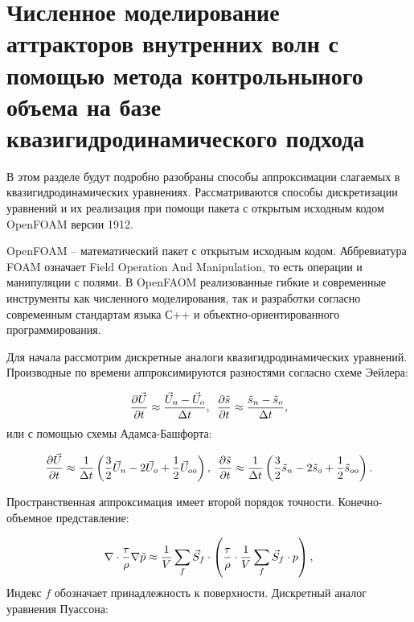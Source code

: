 \section{Численное моделирование аттракторов внутренних волн с помощью метода контрольныного объема на базе квазигидродинамического подхода}

В этом разделе будут подробно разобраны способы аппроксимации слагаемых в квазигидродинамических уравнениях. Рассматриваются способы дискретизации уравнений и их реализация при помощи пакета с открытым исходным кодом OpenFOAM версии 1912\cite{OpenFOAM}.

OpenFOAM -- математический пакет с открытым исходным кодом. Аббревиатура FOAM означает Field Operation And Manipulation, то есть операции и манипуляции с полями. В OpenFAOM реализованные гибкие и современные инструменты как численного моделирования, так и разработки согласно современным стандартам языка С++ и объектно-ориентированного программирования. 

Для начала рассмотрим дискретные аналоги квазигидродинамических уравнений. Производные по времени аппроксимируются разностями согласно схеме Эейлера:

\begin{equation}
    \frac{\partial \vec{U}}{\partial t} \approx \frac{ \vec{U}_n-\vec{U}_o}{\Delta t}, \,\,\,
    \frac{\partial \Tilde{s}}{\partial t} \approx \frac{ \Tilde{s}_n-\Tilde{s}_o}{\Delta t},
\end{equation}
или с помощью схемы Адамса-Башфорта:

\begin{equation}
    \frac{\partial \vec{U}}{\partial t} \approx   \frac{1}{\Delta t} \left  (\frac{3}{2}\vec{U}_n - 2\vec{U}_o + \frac{1}{2} \vec{U}_{oo} \right), \,\,\,
    \frac{\partial \Tilde{s}}{\partial t} \approx \frac{1}{\Delta t} \left (\frac{3}{2}\Tilde{s}_n - 2\Tilde{s}_o + \frac{1}{2} \Tilde{s}_{oo}\right).
\end{equation}

Пространственная аппроксимация имеет второй порядок точности. Конечно-объемное представление:

\begin{equation}
        \nabla \cdot \frac{\tau}{\rho}\nabla \Tilde{p} \approx  \frac{1}{V} \sum_f \vec{S}_f \cdot \left(   \frac{\tau}{\rho} \cdot \frac{1}{V} \sum_f \vec{S}_f \cdot p  \right) ,
\end{equation}
Индекс $f$ обозначает принадлежность к поверхности.
Дискретный аналог уравнения Пуассона:

